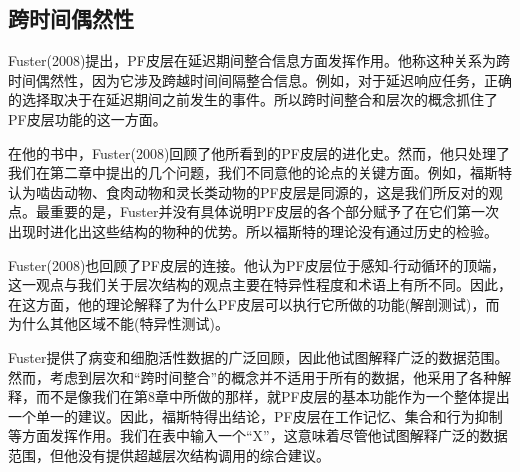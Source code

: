 \subsection{跨时间偶然性}
Fuster(2008)提出，PF皮层在延迟期间整合信息方面发挥作用。他称这种关系为跨时间偶然性，因为它涉及跨越时间间隔整合信息。例如，对于延迟响应任务，正确的选择取决于在延迟期间之前发生的事件。所以跨时间整合和层次的概念抓住了PF皮层功能的这一方面。
\par 
在他的书中，Fuster(2008)回顾了他所看到的PF皮层的进化史。然而，他只处理了我们在第二章中提出的几个问题，我们不同意他的论点的关键方面。例如，福斯特认为啮齿动物、食肉动物和灵长类动物的PF皮层是同源的，这是我们所反对的观点。最重要的是，Fuster并没有具体说明PF皮层的各个部分赋予了在它们第一次出现时进化出这些结构的物种的优势。所以福斯特的理论没有通过历史的检验。
\par 
Fuster(2008)也回顾了PF皮层的连接。他认为PF皮层位于感知-行动循环的顶端，这一观点与我们关于层次结构的观点主要在特异性程度和术语上有所不同。因此，在这方面，他的理论解释了为什么PF皮层可以执行它所做的功能(解剖测试)，而为什么其他区域不能(特异性测试)。
\par 
Fuster提供了病变和细胞活性数据的广泛回顾，因此他试图解释广泛的数据范围。然而，考虑到层次和“跨时间整合”的概念并不适用于所有的数据，他采用了各种解释，而不是像我们在第8章中所做的那样，就PF皮层的基本功能作为一个整体提出一个单一的建议。因此，福斯特得出结论，PF皮层在工作记忆、集合和行为抑制等方面发挥作用。我们在表中输入一个“X”，这意味着尽管他试图解释广泛的数据范围，但他没有提供超越层次结构调用的综合建议。

